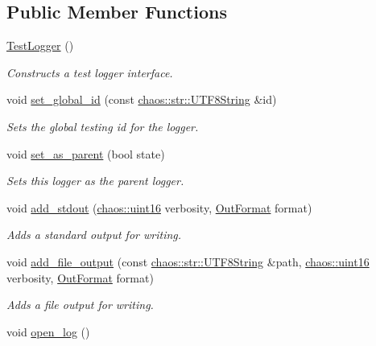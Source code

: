 \subsection*{Public Member Functions}
\begin{DoxyCompactItemize}
\item 
\hyperlink{classchaos_1_1test_1_1_test_logger_a59b5462eea92053f301b8c5e9c61892f}{Test\+Logger} ()
\begin{DoxyCompactList}\small\item\em Constructs a test logger interface. \end{DoxyCompactList}\item 
\hypertarget{classchaos_1_1test_1_1_test_logger_a027da301184408af8751041b7e2314f8}{}void \hyperlink{classchaos_1_1test_1_1_test_logger_a027da301184408af8751041b7e2314f8}{set\+\_\+global\+\_\+id} (const \hyperlink{classchaos_1_1str_1_1_u_t_f8_string}{chaos\+::str\+::\+U\+T\+F8\+String} \&id)\label{classchaos_1_1test_1_1_test_logger_a027da301184408af8751041b7e2314f8}

\begin{DoxyCompactList}\small\item\em Sets the global testing id for the logger. \end{DoxyCompactList}\item 
void \hyperlink{classchaos_1_1test_1_1_test_logger_a95a0c9aa1345a94f84e41caa71e6e8ab}{set\+\_\+as\+\_\+parent} (bool state)
\begin{DoxyCompactList}\small\item\em Sets this logger as the parent logger. \end{DoxyCompactList}\item 
void \hyperlink{classchaos_1_1test_1_1_test_logger_a456e2ef7ebdf42835e9bf2add7b75696}{add\+\_\+stdout} (\hyperlink{namespacechaos_ac3888b1c9e56da7fbbdb3ab8425b4068}{chaos\+::uint16} verbosity, \hyperlink{classchaos_1_1test_1_1_test_logger_a8e6f679501d623e41ac0f0c445a7820d}{Out\+Format} format)
\begin{DoxyCompactList}\small\item\em Adds a standard output for writing. \end{DoxyCompactList}\item 
void \hyperlink{classchaos_1_1test_1_1_test_logger_a1fbb472096b242fb5c18cd4563d37fab}{add\+\_\+file\+\_\+output} (const \hyperlink{classchaos_1_1str_1_1_u_t_f8_string}{chaos\+::str\+::\+U\+T\+F8\+String} \&path, \hyperlink{namespacechaos_ac3888b1c9e56da7fbbdb3ab8425b4068}{chaos\+::uint16} verbosity, \hyperlink{classchaos_1_1test_1_1_test_logger_a8e6f679501d623e41ac0f0c445a7820d}{Out\+Format} format)
\begin{DoxyCompactList}\small\item\em Adds a file output for writing. \end{DoxyCompactList}\item 
\hypertarget{classchaos_1_1test_1_1_test_logger_a81eb3642eda4f8b3a4efa98d78b40592}{}void \hyperlink{classchaos_1_1test_1_1_test_logger_a81eb3642eda4f8b3a4efa98d78b40592}{open\+\_\+log} ()\label{classchaos_1_1test_1_1_test_logger_a81eb3642eda4f8b3a4efa98d78b40592}


\end{DoxyCompactItemize}
